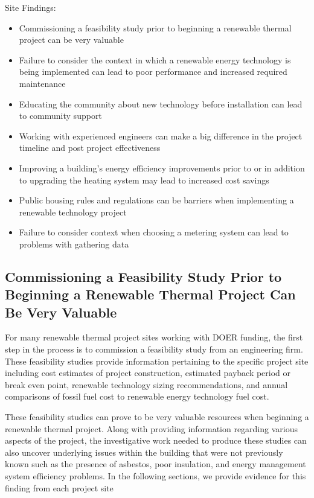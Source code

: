 Site Findings:
  \begin{itemize}
    \item{Commissioning a feasibility study prior to beginning a renewable thermal project can be very valuable}
    \item{Failure to consider the context in which a renewable energy technology is being implemented can lead to poor performance and increased required maintenance}
    \item{Educating the community about new technology before installation can lead to community support}
    \item{Working with experienced engineers can make a big difference in the project timeline and post project effectiveness}
    \item{Improving a building's energy efficiency improvements prior to or in addition to upgrading the heating system may lead to increased cost savings}
    \item{Public housing rules and regulations can be barriers when implementing a renewable technology project}
    \item{Failure to consider context when choosing a metering system can lead to problems with gathering data}
  \end{itemize}

\subsection{Commissioning a Feasibility Study Prior to Beginning a Renewable Thermal Project Can Be Very Valuable}
\par For many renewable thermal project sites working with DOER funding, the first step in the process is to commission a feasibility study from an engineering firm. These feasibility studies provide information pertaining to the specific project site including cost estimates of project construction, estimated payback period or break even point, renewable technology sizing recommendations, and annual comparisons of fossil fuel cost to renewable energy technology fuel cost.
\par These feasibility studies can prove to be very valuable resources when beginning a renewable thermal project. Along with providing information regarding various aspects of the project, the investigative work needed to produce these studies can also uncover underlying issues within the building that were not previously known such as the presence of asbestos, poor insulation, and energy management system efficiency problems. In the following sections, we provide evidence for this finding from each project site

